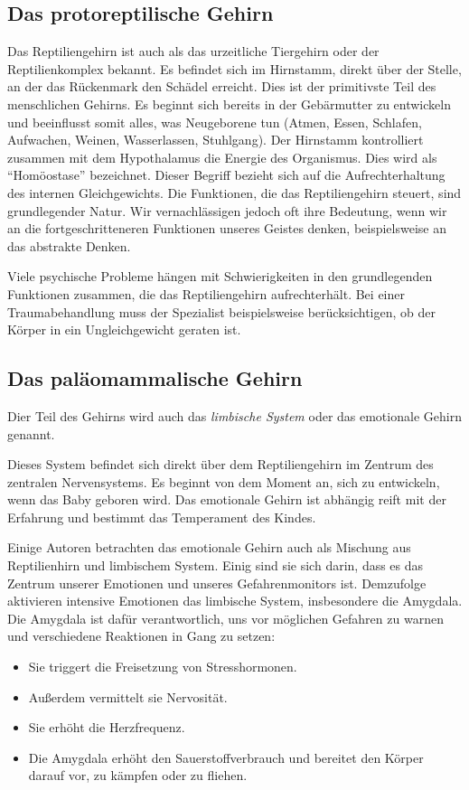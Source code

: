 \documentclass[
    invert-title=false,
    titlepage=true,
    titleimage-ratio=1011,
    parskip=half-,
]{bfhpub}                %
\begin{document}
    \subsection{Das protoreptilische Gehirn}
    Das Reptiliengehirn ist auch als das urzeitliche Tiergehirn oder der Reptilienkomplex bekannt.
    Es befindet sich im Hirnstamm, direkt über der Stelle, an der das Rückenmark den Schädel erreicht.
    Dies ist der primitivste Teil des menschlichen Gehirns.
    Es beginnt sich bereits in der Gebärmutter zu entwickeln und beeinflusst somit alles, was Neugeborene tun (Atmen, Essen, Schlafen, Aufwachen, Weinen, Wasserlassen, Stuhlgang).
    Der Hirnstamm kontrolliert zusammen mit dem Hypothalamus die Energie des Organismus.
    Dies wird als “Homöostase” bezeichnet.
    Dieser Begriff bezieht sich auf die Aufrechterhaltung des internen Gleichgewichts.
    Die Funktionen, die das Reptiliengehirn steuert, sind grundlegender Natur.
    Wir vernachlässigen jedoch oft ihre Bedeutung, wenn wir an die fortgeschritteneren Funktionen unseres Geistes denken, beispielsweise an das abstrakte Denken.

    Viele psychische Probleme hängen mit Schwierigkeiten in den grundlegenden Funktionen zusammen, die das Reptiliengehirn aufrechterhält.
    Bei einer Traumabehandlung muss der Spezialist beispielsweise berücksichtigen, ob der Körper in ein Ungleichgewicht geraten ist.

    \subsection{Das paläomammalische Gehirn}\label{subsec:das-palaomammalische-gehirn}
    Dier Teil des Gehirns wird auch das \textit{limbische System} oder das emotionale Gehirn genannt.

    Dieses System befindet sich direkt über dem Reptiliengehirn im Zentrum des zentralen Nervensystems.
    Es beginnt von dem Moment an, sich zu entwickeln, wenn das Baby geboren wird.
    Das emotionale Gehirn ist abhängig reift mit der Erfahrung und bestimmt das Temperament des Kindes.

    Einige Autoren betrachten das emotionale Gehirn auch als Mischung aus Reptilienhirn und limbischem System.
    Einig sind sie sich darin, dass es das Zentrum unserer Emotionen und unseres Gefahrenmonitors ist.
    Demzufolge aktivieren intensive Emotionen das limbische System, insbesondere die Amygdala.
    Die Amygdala ist dafür verantwortlich, uns vor möglichen Gefahren zu warnen und verschiedene Reaktionen in Gang zu setzen:
    \begin{itemize}
        \item Sie triggert die Freisetzung von Stresshormonen.
        \item Außerdem vermittelt sie Nervosität.
        \item Sie erhöht die Herzfrequenz.
        \item Die Amygdala erhöht den Sauerstoffverbrauch und bereitet den Körper darauf vor, zu kämpfen oder zu fliehen.
    \end{itemize}
\end{document}
